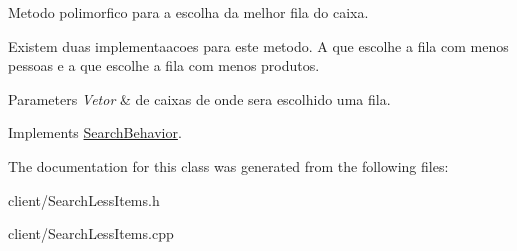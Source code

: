 Metodo polimorfico para a escolha da melhor fila do caixa. 

Existem duas implementaacoes para este metodo. A que escolhe a fila com menos pessoas e a que escolhe a fila com menos produtos.


\begin{DoxyParams}{Parameters}
{\em Vetor} & de caixas de onde sera escolhido uma fila. \\
\hline
\end{DoxyParams}


Implements \hyperlink{classSearchBehavior_a89f9439f664a750f08a9877710a0fd9f}{Search\-Behavior}.



The documentation for this class was generated from the following files\-:\begin{DoxyCompactItemize}
\item 
client/Search\-Less\-Items.\-h\item 
client/Search\-Less\-Items.\-cpp\end{DoxyCompactItemize}

